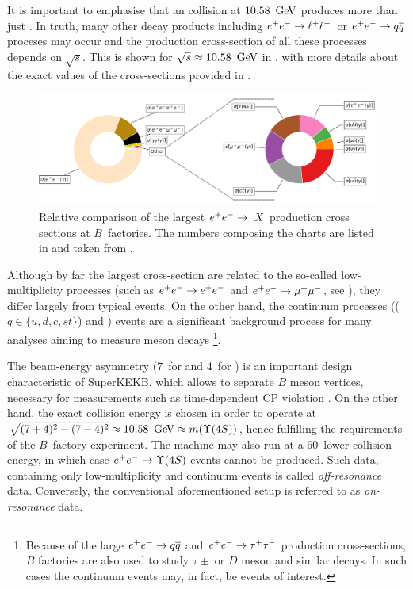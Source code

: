 It is important to emphasise that an \epem collision at $10.58~\mathrm{\,Ge\kern -0.1em V}$ produces more than just \FourS.
In truth, many other decay products including $e^+e^-\rightarrow\ell^+\ell^-$ or $e^+e^-\rightarrow q\overline q$ proceses may occur and the production 
cross-section  of all these processes depends on $\sqrt{s}$.
This is shown for $\sqrt{s}\approx10.58~\mathrm{\,Ge\kern -0.1em V}$ in , with more details about the exact values of the cross-sections provided in .
\begin{figure}[htbp!]
    \includegraphics[width=1\textwidth]{figures/experimental_setup/corss_sections.pdf}
    \caption{\label{fig:cross_sections} Relative comparison of the largest $e^+e^-\rightarrow\ X$ production cross sections at $B$~factories.
    The numbers composing the charts are listed in  and taken from \cite{Belle-II:2018jsg}.
    }
\end{figure}

Although by far the largest cross-section are related to the so-called low-multiplicity processes 
(such as $e^+e^-\rightarrow e^+e^-$ and $e^+e^-\rightarrow\mu^+\mu^-$, see ),
they differ largely from typical \FourS\ra\BB events.
On the other hand, the continuum processes (\epem\ra\qqbar ($q\in\{u,d,c,st\}$) and \epem\ra\tautau) 
events are a significant background process for many analyses aiming to measure \B meson decays
\footnote[1]{Because of the large $e^+e^-\rightarrow q\overline q$ and $e^+e^-\rightarrow\tau^+\tau^-$ production cross-sections, 
$B$ factories are also used to study $\tau\pm$ or $D$ meson and similar decays.
In such cases the continuum events may, in fact, be events of interest.}.

The beam-energy asymmetry (7~\gev for \en and 4~\gev for \ep) is an important design characteristic of SuperKEKB, 
which allows to separate $B$ meson vertices, necessary for measurements such as time-dependent CP violation \cite{BaBar:2014omp}.
On the other hand, the exact collision energy is chosen in order to operate at $\sqrt{(7+4)^2-(7-4)^2}\approx10.58~\gev\approx m(\FourS)$, 
hence fulfilling the requirements of the $B$~factory experiment.
The machine may also run at a 60~\mev lower collision energy, in which case $\epem\ra\FourS$ events cannot be produced.
Such data, containing only low-multiplicity and continuum events is called \textit{off-resonance} data.
Conversely, the conventional aforementioned setup is referred to as \textit{on-resonance} data.

